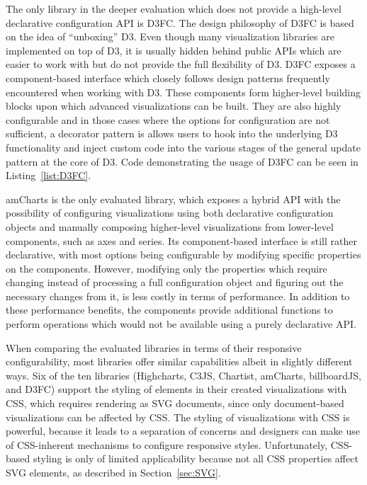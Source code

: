 The only library in the deeper evaluation which does not provide a
high-level declarative configuration API is D3FC.  The design
philosophy of D3FC is based on the idea of \enquote{unboxing} D3.
Even though many visualization libraries are implemented on top of D3,
it is usually hidden behind public APIs which are easier to work with
but do not provide the full flexibility of D3. D3FC exposes a
component-based interface which closely follows design patterns
frequently encountered when working with D3. These components form
higher-level building blocks upon which advanced visualizations can be
built. They are also highly configurable and in those cases where the
options for configuration are not sufficient, a decorator pattern is
allows users to hook into the underlying D3 functionality and inject
custom code into the various stages of the general update pattern at
the core of D3. Code demonstrating the usage of D3FC can be seen in
Listing~\ref{list:D3FC}.


\begin{samepage}
%
A basic bar chart defined using D3FC's component-based API.
},
]{listings/d3fc.js}
\end{samepage}



amCharts is the only evaluated library, which exposes a hybrid API
with the possibility of configuring visualizations using both
declarative configuration objects and manually composing higher-level
visualizations from lower-level components, such as axes and series.
Its component-based interface is still rather declarative, with most
options being configurable by modifying specific properties on the
components. However, modifying only the properties which require
changing instead of processing a full configuration object and
figuring out the necessary changes from it, is less costly in terms of
performance. In addition to these performance benefits, the components
provide additional functions to perform operations which would not be
available using a purely declarative API.




When comparing the evaluated libraries in terms of their responsive
configurability, most libraries offer similar capabilities albeit in
slightly different ways. Six of the ten libraries (Highcharts, C3JS,
Chartist, amCharts, billboardJS, and D3FC) support the styling of
elements in their created visualizations with CSS, which requires
rendering as SVG documents, since only document-based visualizations
can be affected by CSS. The styling of visualizations with CSS is
powerful, because it leads to a separation of concerns and designers
can make use of CSS-inherent mechanisms to configure responsive
styles.  Unfortunately, CSS-based styling is only of limited
applicability because not all CSS properties affect SVG elements, as
described in Section~\ref{sec:SVG}.

